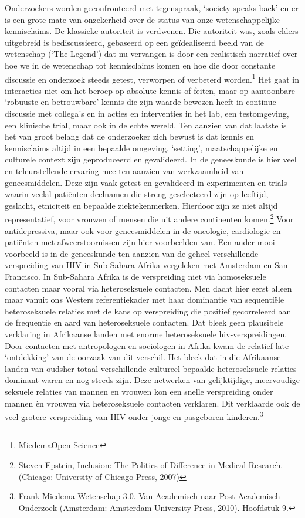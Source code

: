 \documentclass{jote-book}
\begin{document}
	Onderzoekers worden geconfronteerd met tegenspraak, ‘society speaks back' en er is een grote mate van onzekerheid over de status van onze wetenschappelijke kennisclaims. De klassieke autoriteit is verdwenen. Die autoriteit was, zoals elders uitgebreid is bediscussieerd, gebaseerd op een geïdealiseerd beeld van de wetenschap (‘The Legend') dat nu vervangen is door een realistisch narratief over hoe we in de wetenschap tot kennisclaims komen en hoe die door constante discussie en onderzoek steeds getest, verworpen of verbeterd worden.\footnote{MiedemaOpen Science} Het gaat in interacties niet om het beroep op absolute kennis of feiten, maar op aantoonbare ‘robuuste en betrouwbare' kennis die zijn waarde bewezen heeft in continue discussie met collega's en in acties en interventies in het lab, een testomgeving, een klinische trial, maar ook in de echte wereld. Ten aanzien van dat laatste is het van groot belang dat de onderzoeker zich bewust is dat kennis en kennisclaims altijd in een bepaalde omgeving, ‘setting', maatschappelijke en culturele context zijn geproduceerd en gevalideerd. In de geneeskunde is hier veel en teleurstellende ervaring mee ten aanzien van werkzaamheid van geneesmiddelen. Deze zijn vaak getest en gevalideerd in experimenten en trials waarin veelal patiënten deelnamen die streng geselecteerd zijn op leeftijd, geslacht, etniciteit en bepaalde ziektekenmerken. Hierdoor zijn ze niet altijd representatief, voor vrouwen of mensen die uit andere continenten komen.\footnote{Steven Epstein, Inclusion: The Politics of Difference in Medical Research. (Chicago: University of Chicago Press, 2007)} Voor antidepressiva, maar ook voor geneesmiddelen in de oncologie, cardiologie en patiënten met afweerstoornissen zijn hier voorbeelden van. Een ander mooi voorbeeld is in de geneeskunde ten aanzien van de geheel verschillende verspreiding van HIV in Sub-Sahara Afrika vergeleken met Amsterdam en San Francisco. In Sub-Sahara Afrika is de verspreiding niet via homoseksuele contacten maar vooral via heteroseksuele contacten. Men dacht hier eerst alleen maar vanuit ons Westers referentiekader met haar dominantie van sequentiële heteroseksuele relaties met de kans op verspreiding die positief gecorreleerd aan de frequentie en aard van heteroseksuele contacten. Dat bleek geen plausibele verklaring in Afrikaanse landen met enorme heteroseksuele hiv-verspreidingen. Door contacten met antropologen en sociologen in Afrika kwam de relatief late ‘ontdekking' van de oorzaak van dit verschil. Het bleek dat in die Afrikaanse landen van oudsher totaal verschillende cultureel bepaalde heteroseksuele relaties dominant waren en nog steeds zijn. Deze netwerken van gelijktijdige, meervoudige seksuele relaties van mannen en vrouwen kon een snelle verspreiding onder mannen èn vrouwen via heteroseksuele contacten verklaren. Dit verklaarde ook de veel grotere verspreiding van HIV onder jonge en pasgeboren kinderen.\footnote{Frank Miedema Wetenschap 3.0. Van Academisch naar Post Academisch Onderzoek (Amsterdam: Amsterdam University Press, 2010). Hoofdstuk 9. }
\end{document}
